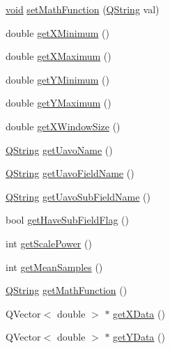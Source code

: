 \begin{DoxyCompactItemize}
\item 
\hyperlink{group___u_a_v_objects_plugin_ga444cf2ff3f0ecbe028adce838d373f5c}{void} \hyperlink{group___scope_plugin_ga8941026dea84deb5daecfa316880c3c7}{set\-Math\-Function} (\hyperlink{group___u_a_v_objects_plugin_gab9d252f49c333c94a72f97ce3105a32d}{\-Q\-String} val)
\item 
double \hyperlink{group___scope_plugin_ga3a62af34baa396699e6736ddcdb64dc3}{get\-X\-Minimum} ()
\item 
double \hyperlink{group___scope_plugin_gaef24895f0dd44554615466c28d374549}{get\-X\-Maximum} ()
\item 
double \hyperlink{group___scope_plugin_ga274c41324919eda32410304280b3e15c}{get\-Y\-Minimum} ()
\item 
double \hyperlink{group___scope_plugin_ga1a2f11fcbe323426d216c9f08cb88bdc}{get\-Y\-Maximum} ()
\item 
double \hyperlink{group___scope_plugin_ga1bd7d819b7cc24c4b73264f145e7dace}{get\-X\-Window\-Size} ()
\item 
\hyperlink{group___u_a_v_objects_plugin_gab9d252f49c333c94a72f97ce3105a32d}{\-Q\-String} \hyperlink{group___scope_plugin_gae2c24d702ce50840beff3b3907508069}{get\-Uavo\-Name} ()
\item 
\hyperlink{group___u_a_v_objects_plugin_gab9d252f49c333c94a72f97ce3105a32d}{\-Q\-String} \hyperlink{group___scope_plugin_ga0ed12e4fd388a14e187425d0619f6a94}{get\-Uavo\-Field\-Name} ()
\item 
\hyperlink{group___u_a_v_objects_plugin_gab9d252f49c333c94a72f97ce3105a32d}{\-Q\-String} \hyperlink{group___scope_plugin_ga0aeeb65196f7617cd931af568a04d174}{get\-Uavo\-Sub\-Field\-Name} ()
\item 
bool \hyperlink{group___scope_plugin_gaac624ceed7580c679cbbb43c46881718}{get\-Have\-Sub\-Field\-Flag} ()
\item 
int \hyperlink{group___scope_plugin_ga598d81218b7c2912d88b61e5b1e9d342}{get\-Scale\-Power} ()
\item 
int \hyperlink{group___scope_plugin_ga21623188dbae082bf46f247209363664}{get\-Mean\-Samples} ()
\item 
\hyperlink{group___u_a_v_objects_plugin_gab9d252f49c333c94a72f97ce3105a32d}{\-Q\-String} \hyperlink{group___scope_plugin_ga22e23fa455628102d53af51bb4ff4a62}{get\-Math\-Function} ()
\item 
\-Q\-Vector$<$ double $>$ $\ast$ \hyperlink{group___scope_plugin_gaadbf87fb25ba73a5079d44e88f357cd9}{get\-X\-Data} ()
\item 
\-Q\-Vector$<$ double $>$ $\ast$ \hyperlink{group___scope_plugin_gac891ccbeaba7cca3cc03233f4ecd0cda}{get\-Y\-Data} ()

\end{DoxyCompactItemize}
